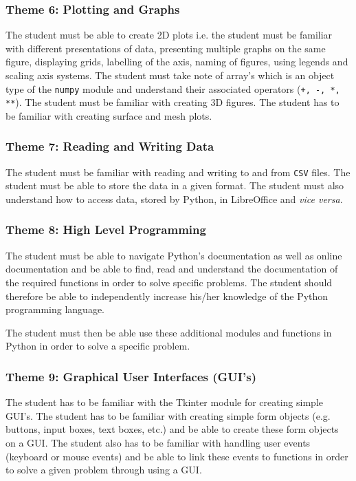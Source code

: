         \subsubsection{Theme 6: Plotting and Graphs}
            The student must be able to create 2D plots i.e. the student must
            be familiar with different presentations of data, presenting
            multiple graphs on the same figure, displaying grids, labelling of
            the axis, naming of figures, using legends and scaling axis
            systems. The student must take note of array's which is an object
            type of the \texttt{numpy} module and understand their associated
            operators (\texttt{+, -, *, **}). The student must be familiar
            with creating 3D figures. The student has to be familiar with
            creating surface and mesh plots.

        \subsubsection{Theme 7: Reading and Writing Data}
            The student must be familiar with reading and writing to and from
            \texttt{CSV} files. The student must be able to store the data in
            a given format. The student must also understand how to access
            data, stored by Python, in LibreOffice and \textit{vice versa}.

        \subsubsection{Theme 8: High Level Programming}
            The student must be able to navigate Python's documentation as well
            as online documentation and be able to find, read and understand
            the documentation of the required functions in order to solve
            specific problems. The student should therefore be able to
            independently increase his/her knowledge of the Python programming
            language.

            The student must then be able use these additional modules and
            functions in Python in order to solve a specific problem.

        \subsubsection{Theme 9: Graphical User Interfaces (GUI's)}
            The student has to be familiar with the Tkinter module for creating
            simple GUI's. The student has to be familiar with creating simple
            form objects (e.g. buttons, input boxes, text boxes, etc.) and be
            able to create these form objects on a GUI. The student also has to
            be familiar with handling user events (keyboard or mouse events)
            and be able to link these events to functions in order to solve a
            given problem through using a GUI.


